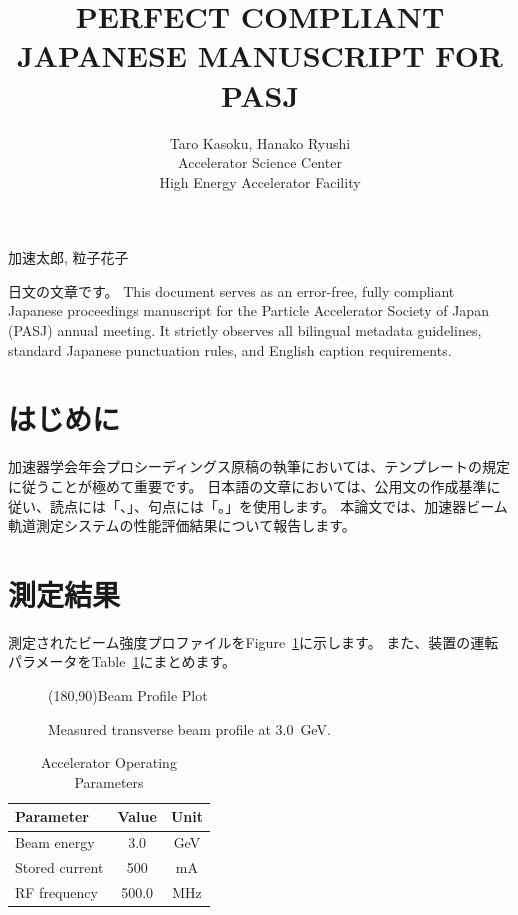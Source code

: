 \documentclass{PASJ2026}
\begin{document}
\title{PERFECT COMPLIANT JAPANESE MANUSCRIPT FOR PASJ}

\jauthor
{
加速太郎,
粒子花子
}

\author
{
Taro Kasoku,
Hanako Ryushi\\
 Accelerator Science Center\\
 High Energy Accelerator Facility\\
}

\Abstract
{
日文の文章です。 This document serves as an error-free, fully compliant Japanese proceedings manuscript for the Particle Accelerator Society of Japan (PASJ) annual meeting. It strictly observes all bilingual metadata guidelines, standard Japanese punctuation rules, and English caption requirements.
}

\maketitle

\section{はじめに}
加速器学会年会プロシーディングス原稿の執筆においては、テンプレートの規定に従うことが極めて重要です。
日本語の文章においては、公用文の作成基準に従い、読点には「、」、句点には「。」を使用します。
本論文では、加速器ビーム軌道測定システムの性能評価結果について報告します。

\section{測定結果}
測定されたビーム強度プロファイルをFigure~\ref{fig:profile}に示します。
また、装置の運転パラメータをTable~\ref{tab:params}にまとめます。

\begin{figure}[htb]
\centering
\framebox(180,90){Beam Profile Plot}
\caption{Measured transverse beam profile at 3.0~GeV.}
\label{fig:profile}
\end{figure}

\begin{table}[htb]
\caption{Accelerator Operating Parameters}
\label{tab:params}
\centering
\begin{tabular}{lcc}
\hline
Parameter & Value & Unit \\
\hline
Beam energy & 3.0 & GeV \\
Stored current & 500 & mA \\
RF frequency & 500.0 & MHz \\
\hline
\end{tabular}
\end{table}
\end{document}
